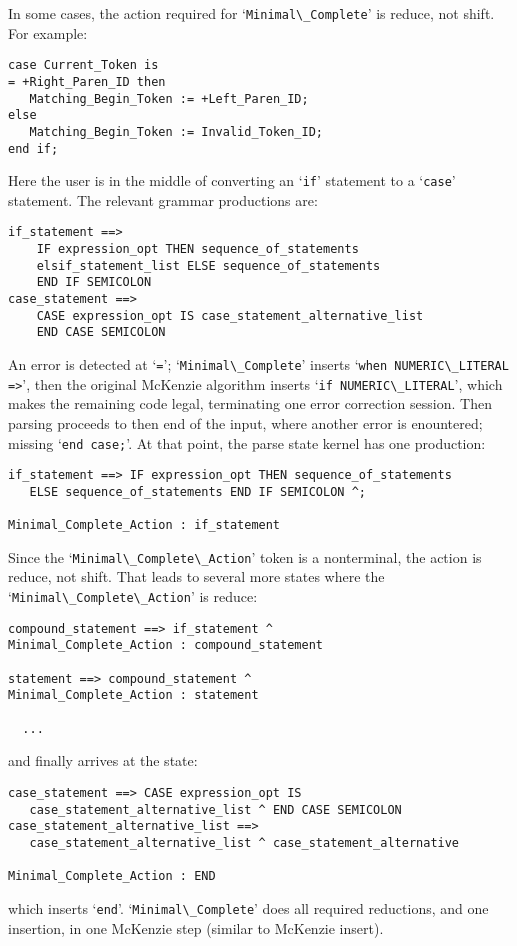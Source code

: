 \documentclass[authordraft]{acmart}
\newcommand{\code}[1]{`\lstinline|#1|'}
\begin{document}
In some cases, the action required for \code{Minimal\_Complete} is
reduce, not shift. For example:
\begin{lstlisting}
case Current_Token is
= +Right_Paren_ID then
   Matching_Begin_Token := +Left_Paren_ID;
else
   Matching_Begin_Token := Invalid_Token_ID;
end if;
\end{lstlisting}
Here the user is in the middle of converting an \code{if} statement to
a \code{case} statement. The relevant grammar productions are:
\begin{verbatim}
if_statement ==>
    IF expression_opt THEN sequence_of_statements
    elsif_statement_list ELSE sequence_of_statements
    END IF SEMICOLON
case_statement ==>
    CASE expression_opt IS case_statement_alternative_list
    END CASE SEMICOLON
\end{verbatim}
An error is detected at \code{=}; \code{Minimal\_Complete} inserts
\code{when NUMERIC\_LITERAL =>}, then the original McKenzie algorithm
inserts \code{if NUMERIC\_LITERAL}, which makes the remaining code
legal, terminating one error correction session. Then parsing proceeds
to then end of the input, where another error is enountered; missing
\code{end case;}. At that point, the parse state kernel has one
production:
\begin{verbatim}
if_statement ==> IF expression_opt THEN sequence_of_statements
   ELSE sequence_of_statements END IF SEMICOLON ^;

Minimal_Complete_Action : if_statement
\end{verbatim}
Since the \code{Minimal\_Complete\_Action} token is a nonterminal, the action
is reduce, not shift. That leads to several more states where the
\code{Minimal\_Complete\_Action} is reduce:
\begin{verbatim}
compound_statement ==> if_statement ^
Minimal_Complete_Action : compound_statement

statement ==> compound_statement ^
Minimal_Complete_Action : statement

  ...
\end{verbatim}

and finally arrives at the state:
\begin{verbatim}
case_statement ==> CASE expression_opt IS
   case_statement_alternative_list ^ END CASE SEMICOLON
case_statement_alternative_list ==>
   case_statement_alternative_list ^ case_statement_alternative

Minimal_Complete_Action : END
\end{verbatim}
which inserts \code{end}. \code{Minimal\_Complete} does all required
reductions, and one insertion, in one McKenzie step (similar to
McKenzie insert).
\end{document}
